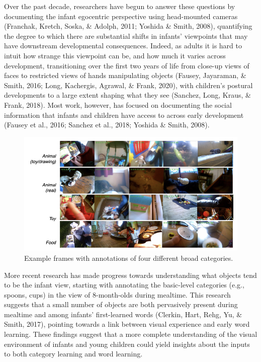 \documentclass[10pt, letterpaper]{article}
\newenvironment{CodeChunk}{}{}
\begin{document}
Over the past decade, researchers have begun to answer these questions
by documenting the infant egocentric perspective using head-mounted
cameras (Franchak, Kretch, Soska, \& Adolph, 2011; Yoshida \& Smith,
2008), quantifying the degree to which there are substantial shifts in
infants' viewpoints that may have downstream developmental consequences.
Indeed, as adults it is hard to intuit how strange this viewpoint can
be, and how much it varies across development, transitioning over the
first two years of life from close-up views of faces to restricted views
of hands manipulating objects (Fausey, Jayaraman, \& Smith, 2016; Long,
Kachergis, Agrawal, \& Frank, 2020), with children's postural
developments to a large extent shaping what they see (Sanchez, Long,
Kraus, \& Frank, 2018). Most work, however, has focused on documenting
the social information that infants and children have access to across
early development (Fausey et al., 2016; Sanchez et al., 2018; Yoshida \&
Smith, 2008).

\begin{CodeChunk}
\begin{figure}[h]

{\centering \includegraphics{figs/examples-1} 

}

\caption[Example frames with annotations of four different broad categories]{Example frames with annotations of four different broad categories.}\label{fig:examples}
\end{figure}
\end{CodeChunk}

More recent research has made progress towards understanding what
objects tend to be the infant view, starting with annotating the
basic-level categories (e.g., spoons, cups) in the view of 8-month-olds
during mealtime. This research suggests that a small number of objects
are both pervasively present during mealtime and among infants'
first-learned words (Clerkin, Hart, Rehg, Yu, \& Smith, 2017), pointing
towards a link between visual experience and early word learning. These
findings suggest that a more complete understanding of the visual
environment of infants and young children could yield insights about the
inputs to both category learning and word learning.
\end{document}
